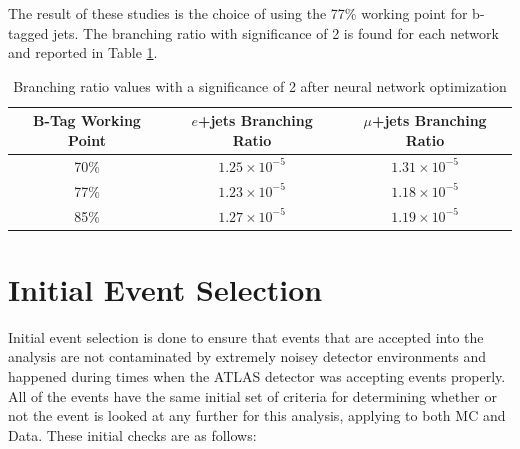 The result of these studies is the choice of using the 77\% working point for b-tagged jets.  The branching ratio with significance of 2 is found for each network and reported in Table \ref{tab:BRsAfterNN}.

\begin{table}[]
\begin{center}
{\renewcommand{\arraystretch}{1.2}
\begin{tabular}{ccc}
\hline
B-Tag Working Point  &  $e$+jets Branching Ratio   & $\mu$+jets Branching Ratio  \\  \hline 
70\%            &  $1.25\times10^{-5}$  &  $1.31\times10^{-5}$\\
77\%           &   $1.23\times10^{-5}$ &   $1.18\times10^{-5}$	\\  
85\%            &  $1.27\times10^{-5}$ &   $1.19\times10^{-5}$	\\ \hline
\end{tabular}
\caption{Branching ratio values with a significance of 2 after neural network optimization}
\label{tab:BRsAfterNN}
}
\end{center}
\end{table}





\section{Initial Event Selection}
\label{sec:InitSelec}
Initial event selection is done to ensure that events that are accepted into the analysis are not contaminated by extremely noisey detector environments and happened during times when the ATLAS detector was accepting events properly.  All of the events  have the same initial set of criteria for determining whether or not the event is looked at any further for this analysis, applying to both MC and Data.  These initial checks are as follows:

